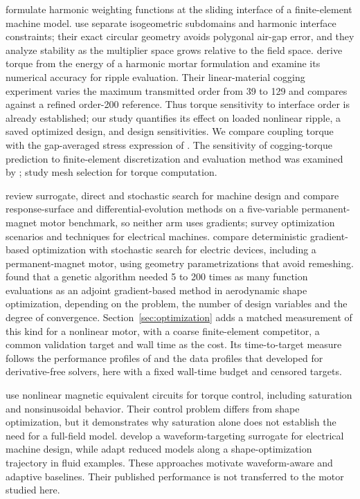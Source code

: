 \documentclass{anvil-paper}
\begin{document}
\citet{degersem2004harmonic} formulate harmonic weighting functions at
the sliding interface of a finite-element machine model.
\citet{bontinck2018isogeometric} use separate isogeometric subdomains and
harmonic interface constraints; their exact circular geometry avoids
polygonal air-gap error, and they analyze stability as the multiplier space
grows relative to the field space. \citet{egger2022torque} derive torque from the
energy of a harmonic mortar formulation and examine its numerical
accuracy for ripple evaluation. Their linear-material cogging experiment
varies the maximum transmitted order from 39 to 129 and compares against
a refined order-200 reference. Thus torque sensitivity to interface order
is already established; our study quantifies its effect on loaded nonlinear
ripple, a saved optimized design, and design sensitivities. We compare
coupling torque with the gap-averaged stress expression of
\citet{arkkio1987}. The sensitivity of cogging-torque prediction to
finite-element discretization and evaluation method was examined by
\citet{howe1992cogging}; \citet{arkkio2012proper} study mesh selection for
torque computation.

\citet{duan2013review} review surrogate, direct and stochastic
search for machine design and compare response-surface and
differential-evolution methods on a five-variable permanent-magnet motor
benchmark, so neither arm uses gradients; \citet{bramerdorfer2018modern} survey optimization scenarios and
techniques for electrical machines. \citet{ion2018robust} compare
deterministic gradient-based optimization with stochastic search for
electric devices, including a permanent-magnet motor, using geometry
parametrizations that avoid remeshing. \citet{zingg2008comparative} found
that a genetic algorithm needed 5 to 200 times as many function
evaluations as an adjoint gradient-based method in aerodynamic shape
optimization, depending on the problem, the number of design variables and
the degree of convergence. Section~\ref{sec:optimization} adds a matched
measurement of this kind for a nonlinear motor, with a coarse
finite-element competitor, a common validation target and wall time as the
cost. Its time-to-target measure follows the performance profiles of
\citet{dolan2002benchmarking} and the data profiles that
\citet{more2009benchmarking} developed for derivative-free solvers, here
with a fixed wall-time budget and censored targets.

\citet{kemmetmueller2015} use nonlinear magnetic equivalent circuits for
torque control, including saturation and nonsinusoidal behavior. Their
control problem differs from shape optimization, but it demonstrates why
saturation alone does not establish the need for a full-field model.
\citet{roomi2022} develop a waveform-targeting surrogate for electrical
machine design, while \citet{wen2023} adapt reduced models along a
shape-optimization trajectory in fluid examples. These approaches motivate
waveform-aware and adaptive baselines. Their published performance is not
transferred to the motor studied here.
\end{document}

